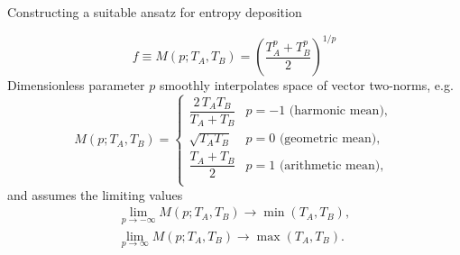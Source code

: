 \documentclass[svgnames]{beamer}
\begin{document}
\begin{frame}{Constructing a suitable ansatz for entropy deposition}

\begin{equation}
 f \equiv M(p;T_A,T_B) = \left(\frac{T_A^p + T_B^p}{2} \right) ^{1/p} \nonumber
\end{equation}
Dimensionless parameter $p$ smoothly interpolates space of vector two-norms, e.g.
\begin{equation}
  M(p; T_A, T_B) =
  \begin{cases}
    \dfrac{2\, T_A T_B}{T_A + T_B} & p = -1 \text{ (harmonic mean)}, \\[2ex]
    \sqrt{T_A T_B} & p = 0 \text{ (geometric mean)}, \\[2ex]
    \dfrac{T_A + T_B}{2} & p = 1 \text{ (arithmetic mean)}, \\[2ex]
  \end{cases}
  \nonumber
\end{equation}
and assumes the limiting values
\begin{eqnarray}
 \lim\limits_{p\rightarrow -\infty}M(p;T_A,T_B) \rightarrow \min{(T_A,T_B)}, \nonumber \\
 \lim\limits_{p\rightarrow \infty}M(p;T_A,T_B) \rightarrow \max{(T_A,T_B)}. \nonumber
\end{eqnarray}
 
\end{frame}
\end{document}
